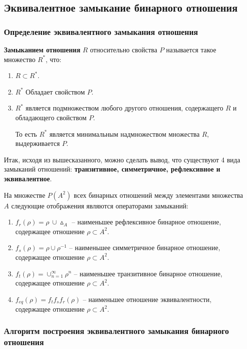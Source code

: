 \documentclass[bachelor, och, labwork]{shiza}
\begin{document}
\subsection{Эквивалентное замыкание бинарного отношения}

\subsubsection{Определение эквивалентного замыкания отношения}

\textbf{Замыканием отношения} $R$ относительно свойства $P$ называется такое
множество $R^*$, что:

\begin{enumerate}
    \item $R \subset R^*$.
    \item $R^*$ Обладает свойством $P$.
    \item $R^*$ является подмножеством любого другого отношения, содержащего $R$
    и обладающего свойством $P$. 

    То есть $R^*$ является минимальным надмножеством множества $R$, 
    выдерживается $P$.
\end{enumerate}

Итак, исходя из вышесказанного, можно сделать вывод, что существуют 4 вида 
замыканий отношений: \textbf{транзитивное, симметричное, рефлексивное и
эквивалентное}.

На множестве $P(A^2)$ всех бинарных отношений между элементами множества $A$ 
следующие отображения являются операторами замыканий:
\begin{enumerate}
    \item $f_r(\rho) = \rho ~\cup \vartriangle_A$ -- наименьшее рефлексивное
    бинарное отношение, содержащее отношение $\rho \subset A^2$. 
    \item $f_s(\rho) = \rho \cup \rho^{-1}$ -- наименьшее симметричное
    бинарное отношение, содержащее отношение $\rho \subset A^2$.
    \item $f_t(\rho) = \cup^{\infty}_{n=1} \rho^n$ -- наименьшее транзитивное
    бинарное отношение, содержащее отношение $\rho \subset A^2$.
    \item $f_{eq}(\rho) = f_tf_sf_r(\rho)$ -- наименьшее отношение эквивалентности,
    содержащее отношение $\rho \subset A^2$.
\end{enumerate}

\subsubsection{Алгоритм построения эквивалентного замыкания бинарного отношения}
\end{document}
